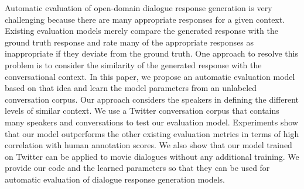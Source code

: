 Automatic evaluation of open-domain dialogue response generation is very challenging because there are many appropriate responses for a given context. Existing evaluation models merely compare the generated response with the ground truth response and rate many of the appropriate responses as inappropriate if they deviate from the ground truth. One approach to resolve this problem is to consider the similarity of the generated response with the conversational context. In this paper, we propose an automatic evaluation model based on that idea and learn the model parameters from an unlabeled conversation corpus. Our approach considers the speakers in defining the different levels of similar context. We use a Twitter conversation corpus that contains many speakers and conversations to test our evaluation model. Experiments show that our model outperforms the other existing evaluation metrics in terms of high correlation with human annotation scores. We also show that our model trained on Twitter can be applied to movie dialogues without any additional training. We provide our code and the learned parameters so that they can be used for automatic evaluation of dialogue response generation models.

